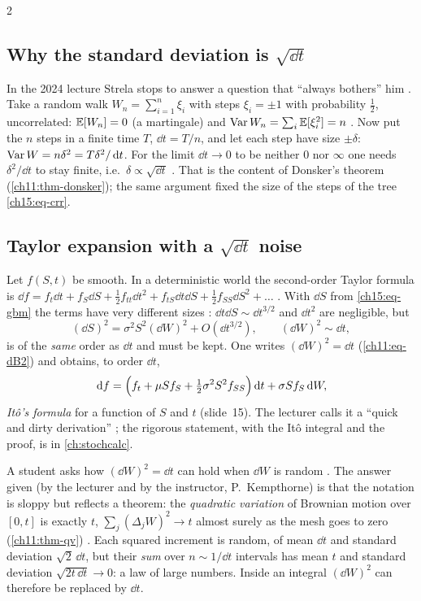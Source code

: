 \begin{paracol}{2}
\subsection{Why the standard deviation is $\sqrt{\dd t}$}
In the 2024 lecture Strela stops to answer a question that ``always bothers'' him . Take a random walk $W_n=\sum_{i=1}^n\xi_i$ with steps $\xi_i=\pm1$ with
probability $\frac12$, uncorrelated: $\mathbb{E}[W_n]=0$ (a martingale) and $\operatorname{Var} W_n=\sum_i\mathbb{E}[\xi_i^2]=n$
. Now put the $n$ steps in a finite time $T$, $\dd t=T/n$, and let each step have size $\pm\delta$:
$\operatorname{Var} W=n\delta^2=T\delta^2/\,\mathrm{d} t$. For the limit $\dd t\to0$ to be neither $0$ nor $\infty$ one needs $\delta^2/\dd t$ to stay finite, i.e.\ $\delta\propto\sqrt{\dd t}$
. That is the content of Donsker's theorem (\cref{ch11:thm-donsker}); the same
argument fixed the size of the steps of the tree \eqref{ch15:eq-crr}.

\subsection{Taylor expansion with a $\sqrt{\dd t}$ noise}
Let $f(S,t)$ be smooth. In a deterministic world the second-order Taylor formula is
$\dd f=f_t\dd t+f_S\dd S+\tfrac12f_{tt}\dd t^2+f_{tS}\dd t\dd S+\tfrac12f_{SS}\dd S^2+\dots$ . With $\dd S$ from \eqref{ch15:eq-gbm} the terms have very
different sizes : $\dd t\dd S\sim\dd t^{3/2}$ and $\dd t^2$ are negligible, but
\[
  (\dd S)^2=\sigma^2S^2(\dd W)^2+O(\dd t^{3/2}),\qquad(\dd W)^2\sim\dd t,
\]
is of the \emph{same} order as $\dd t$ and must be kept. One writes $(\dd W)^2=\dd t$ (\cref{ch11:eq-dB2}) and obtains, to order $\dd t$,
\begin{equation}\label{ch15:eq-ito}
  \,\mathrm{d} f=\Bigl(f_t+\mu Sf_S+\tfrac12\sigma^2S^2f_{SS}\Bigr)\,\mathrm{d} t+\sigma Sf_S\,\mathrm{d} W,
\end{equation}
\emph{It\^o's formula} for a function of $S$ and $t$ (slide~15). The lecturer calls it a ``quick and dirty derivation'' ; the
rigorous statement, with the It\^o integral and the proof, is in \cref{ch:stochcalc}.

\begin{coursenote}
A student asks how $(\dd W)^2=\dd t$ can hold when $\dd W$ is random . The answer given (by the lecturer and by the instructor, P.~Kempthorne) is that
the notation is sloppy but reflects a theorem: the \emph{quadratic variation} of Brownian motion over $[0,t]$ is exactly $t$,
$\sum_j(\Delta_jW)^2\to t$ almost surely as the mesh goes to zero (\cref{ch11:thm-qv}) . Each squared increment is random, of mean $\dd t$
and standard deviation $\sqrt2\,\dd t$, but their \emph{sum} over $n\sim1/\dd t$ intervals has mean $t$ and standard deviation
$\sqrt{2t\,\dd t}\to0$: a law of large numbers. Inside an integral $(\dd W)^2$ can therefore be replaced by $\dd t$.
\end{coursenote}


\end{paracol}
